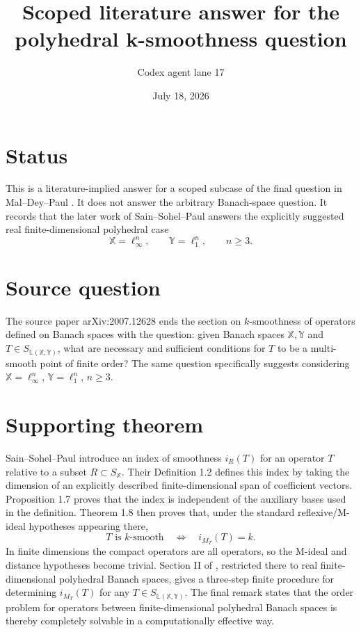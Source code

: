 \documentclass[11pt]{article}
\title{Scoped literature answer for the polyhedral k-smoothness question}
\author{Codex agent lane 17}
\date{July 18, 2026}
\newcommand{\X}{\mathbb X}
\newcommand{\Y}{\mathbb Y}
\newcommand{\Lin}{\mathbb L}
\begin{document}
\maketitle

\section*{Status}

This is a literature-implied answer for a scoped subcase of the final
question in Mal--Dey--Paul \cite{MDP}.  It does not answer the arbitrary
Banach-space question.  It records that the later work of
Sain--Sohel--Paul \cite{SSP} answers the explicitly suggested real
finite-dimensional polyhedral case
\[
  \X=\ell_\infty^n,\qquad \Y=\ell_1^n,\qquad n\geq 3.
\]

\section*{Source question}

The source paper arXiv:2007.12628 ends the section on
\(k\)-smoothness of operators defined on Banach spaces with the question:
given Banach spaces \(\X,\Y\) and \(T\in S_{\Lin(\X,\Y)}\), what are
necessary and sufficient conditions for \(T\) to be a multi-smooth point
of finite order?  The same question specifically suggests considering
\(\X=\ell_\infty^n\), \(\Y=\ell_1^n\), \(n\geq 3\).

\section*{Supporting theorem}

Sain--Sohel--Paul \cite{SSP} introduce an index of smoothness \(i_R(T)\)
for an operator \(T\) relative to a subset \(R\subset S_\X\).  Their
Definition 1.2 defines this index by taking the dimension of an explicitly
described finite-dimensional span of coefficient vectors.  Proposition
1.7 proves that the index is independent of the auxiliary bases used in
the definition.  Theorem 1.8 then proves that, under the standard
reflexive/M-ideal hypotheses appearing there,
\[
  T\text{ is }k\text{-smooth}\quad\Longleftrightarrow\quad
  i_{M_T}(T)=k.
\]
In finite dimensions the compact operators are all operators, so the
M-ideal and distance hypotheses become trivial.  Section II of
\cite{SSP}, restricted there to real finite-dimensional polyhedral
Banach spaces, gives a three-step finite procedure for determining
\(i_{M_T}(T)\) for any \(T\in S_{\Lin(\X,\Y)}\).  The final remark states
that the order problem for operators between finite-dimensional
polyhedral Banach spaces is thereby completely solvable in a
computationally effective way.
\end{document}
